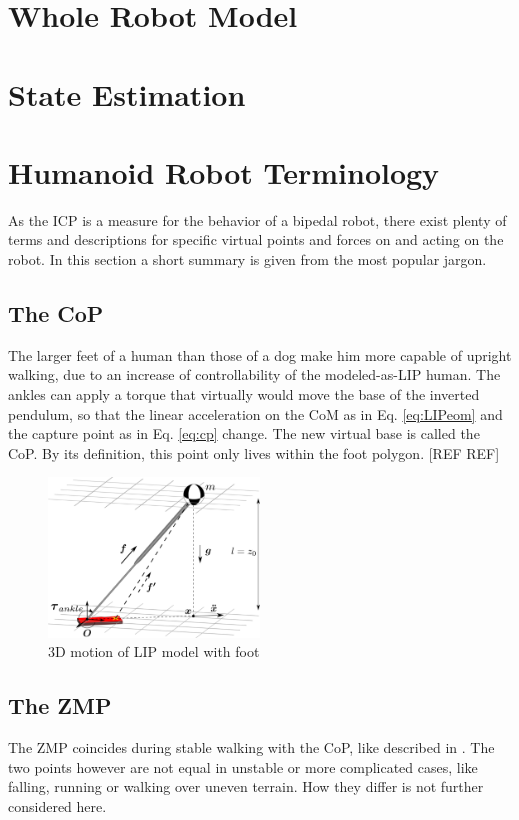 \section{Whole Robot Model}
\section{State Estimation}
\section{Humanoid Robot Terminology}
As the \ac{ICP} is a measure for the behavior of a bipedal robot, there exist plenty of terms and descriptions for specific virtual points and forces on and acting on the robot. In this section a short summary is given from the most popular jargon.
\subsection{The \ac{CoP}}
The larger feet of a human than those of a dog make him more capable of upright walking, due to an increase of controllability of the modeled-as-\ac{LIP} human. The ankles can apply a torque that virtually would move the base of the inverted pendulum, so that the linear acceleration on the \ac{CoM} as in Eq. \eqref{eq:LIPeom} and the capture point as in Eq. \eqref{eq:cp} change. The new virtual base is called the \ac{CoP}. By its definition, this point only lives within the foot polygon. [REF REF]
\begin{figure}[h]
\centering
\includegraphics[width=0.5\textwidth]{STYLESTUFF/3DCoMwithfoot.png}
\caption{\ac{3D} motion of \ac{LIP} model with foot}
\label{fig:3dlipfoot}
\end{figure}
\subsection{The \ac{ZMP}}
The \ac{ZMP} coincides during stable walking with the \ac{CoP}, like described in \cite{vukobratovic2004zero}. The two points however are not equal in unstable or more complicated cases, like falling, running or walking over uneven terrain. How they differ is not further considered here.
